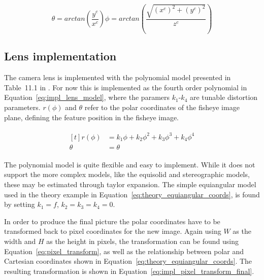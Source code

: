 \begin{subequations}
    \begin{equation}
        \theta = arctan\left(\frac{y^c}{x^c}\right)
        \label{eq:impl_polar_transform_theta}
    \end{equation}
    \begin{equation}
        \phi = arctan\left(\frac{\sqrt{(x^c)^2 + (y^c)^2}}{z^c}\right)
        \label{eq:impl_polar_transform_phi}
    \end{equation}
    \label{eq:impl_polar_transform}
\end{subequations}

\subsection{Lens implementation} \label{sec:lens_modeling}

The camera lens is implemented with the polynomial model presented in Table~11.1 in \cite{FisheyeCorke}. For now this is implemented as the fourth order polynomial in Equation~\eqref{eq:impl_lens_model}, where the paramers $k_1$-$k_4$ are tunable distortion parameters. $r(\phi)$ and $\theta$ refer to the polar coordinates of the fisheye image plane, defining the feature position in the fisheye image.

\begin{align}
    \begin{aligned}[t]
    r(\phi) &= k_1 \phi + k_2 \phi^2 + k_3 \phi^3 + k_4 \phi^4 \\[0.75ex]
    \theta &= \theta
    \end{aligned}
    \label{eq:impl_lens_model}
\end{align}

The polynomial model is quite flexible and easy to implement. While it does not support the more complex models, like the equisolid and stereographic models, these may be estimated through taylor expansion. The simple equiangular model used in the theory example in Equation~\eqref{eq:theory_equiangular_coords}, is found by setting $k_1 = f$, $k_2 = k_3 = k_4 = 0$.

In order to produce the final picture the polar coordinates have to be transformed back to pixel coordinates for the new image. Again using $W$ as the width and $H$ as the height in pixels, the transformation can be found using Equation~\eqref{eq:pixel_transform}, as well as the relationship between polar and Cartesian coordinates shown in Equation~\eqref{eq:theory_equiangular_coords}. The resulting transformation is shown in Equation~\eqref{eq:impl_pixel_transform_final}.

